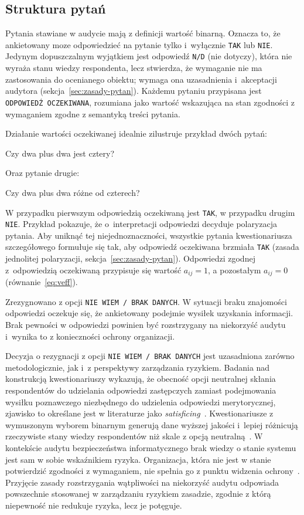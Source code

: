 \subsection{Struktura pytań}
\label{sec:struktura-pytan}

Pytania stawiane w audycie mają z definicji wartość binarną. Oznacza to, że ankietowany moze odpowiedzieć na pytanie tylko i~wyłącznie \texttt{TAK} lub \texttt{NIE}. Jedynym dopuszczalnym wyjątkiem jest odpowiedź \texttt{N/D} (nie dotyczy), która nie wyraża stanu wiedzy respondenta, lecz stwierdza, że wymaganie nie ma zastosowania do ocenianego obiektu; wymaga ona uzasadnienia i~akceptacji audytora (sekcja~\ref{sec:zasady-pytan}). Każdemu pytaniu przypisana jest \texttt{ODPOWIEDŹ OCZEKIWANA},
rozumiana jako wartość wskazująca na stan zgodności z wymaganiem zgodne z semantyką treści pytania.

Działanie wartości oczekiwanej idealnie zilustruje przykład dwóch pytań:
\begin{center}
  Czy dwa plus dwa jest cztery?
\end{center}
Oraz pytanie drugie:
\begin{center}
  Czy dwa plus dwa różne od czterech?
\end{center}
W przypadku pierwszym odpowiedzią oczekiwaną jest \texttt{TAK}, w przypadku drugim  \texttt{NIE}. Przykład pokazuje, że o~interpretacji odpowiedzi decyduje polaryzacja pytania. Aby uniknąć tej niejednoznaczności, wszystkie pytania kwestionariusza szczegółowego formułuje się tak, aby odpowiedź oczekiwana brzmiała \texttt{TAK} (zasada jednolitej polaryzacji, sekcja~\ref{sec:zasady-pytan}). Odpowiedzi zgodnej z~odpowiedzią oczekiwaną przypisuje się wartość $a_{ij} = 1$, a pozostałym $a_{ij} = 0$ (równanie~\eqref{eq:veff}).

Zrezygnowano z opcji \texttt{NIE WIEM / BRAK DANYCH}. W sytuacji braku znajomości odpowiedzi oczekuje się, że ankietowany podejmie wysiłek uzyskania informacji. Brak pewności w odpowiedzi powinien
być rozstrzygany na niekorzyść audytu i~wynika to z konieczności ochrony organizacji.

Decyzja o rezygnacji z opcji \texttt{NIE WIEM / BRAK DANYCH} jest uzasadniona zarówno metodologicznie, jak i~z perspektywy zarządzania ryzykiem. Badania nad konstrukcją kwestionariuszy wykazują, że obecność
opcji neutralnej skłania respondentów do udzielania odpowiedzi zastępczych zamiast podejmowania wysiłku poznawczego niezbędnego do udzielenia odpowiedzi merytorycznej, zjawisko to określane jest w literaturze jako \textit{satisficing}~\autocite{Krosnick2002DontKnow}.
Kwestionariusze z wymuszonym wyborem binarnym generują dane wyższej jakości i~lepiej różnicują rzeczywiste stany wiedzy respondentów niż skale z opcją neutralną~\autocite{Dolnicar2011ForcedBinary}. 
W kontekście audytu bezpieczeństwa informatycznego brak wiedzy o stanie systemu jest sam w sobie wskaźnikiem ryzyka. Organizacja, która nie jest w stanie potwierdzić zgodności z wymaganiem, nie spełnia go z punktu
widzenia ochrony~\autocite{Waters2021DontKnow}. Przyjęcie zasady rozstrzygania wątpliwości na niekorzyść audytu odpowiada powszechnie stosowanej w zarządzaniu ryzykiem zasadzie, zgodnie z którą niepewność nie redukuje ryzyka, lecz je potęguje.

